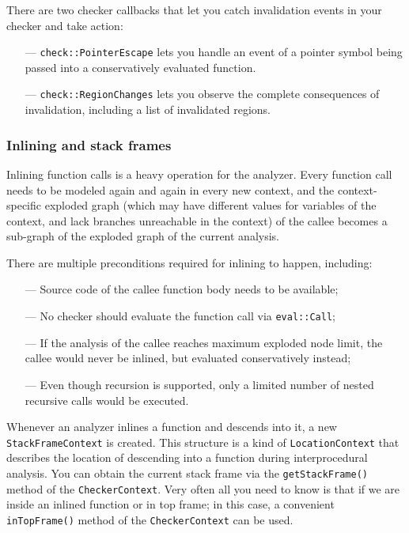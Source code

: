 \documentclass[a4paper,12pt]{article}
\newenvironment{nobr}{\begin{minipage}{\textwidth}\setlength\parskip{1em}
}{\end{minipage}\ignorespacesafterend}
\begin{document}
\begin{nobr}
There are two checker callbacks that let you catch invalidation events in your checker and take action:
\begin{itemize}
\item[---]\lstinline|check::PointerEscape| lets you handle an event of a pointer symbol being passed into a conservatively evaluated function.
\item[---]\lstinline|check::RegionChanges| lets you observe the complete consequences of invalidation, including a list of invalidated regions.
\end{itemize}
\end{nobr}

\subsubsection{Inlining and stack frames}

Inlining function calls is a heavy operation for the analyzer. Every function call needs to be modeled again and again in every new context, and the context-specific exploded graph (which may have different values for variables of the context, and lack branches unreachable in the context) of the callee becomes a sub-graph of the exploded graph of the current analysis.

There are multiple preconditions required for inlining to happen, including:
\begin{itemize}
\item[---]Source code of the callee function body needs to be available;
\item[---]No checker should evaluate the function call via \lstinline|eval::Call|;
\item[---]If the analysis of the callee reaches maximum exploded node limit, the callee would never be inlined, but evaluated conservatively instead;
\item[---]Even though recursion is supported, only a limited number of nested recursive calls would be executed.
\end{itemize}

Whenever an analyzer inlines a function and descends into it, a new \lstinline|StackFrameContext| is created. This structure is a kind of \lstinline|LocationContext| that describes the location of descending into a function during interprocedural analysis. You can obtain the current stack frame via the \lstinline|getStackFrame()| method of the \lstinline|CheckerContext|. Very often all you need to know is that if we are inside an inlined function or in top frame; in this case, a convenient \lstinline|inTopFrame()| method of the \lstinline|CheckerContext| can be used.
\end{document}
